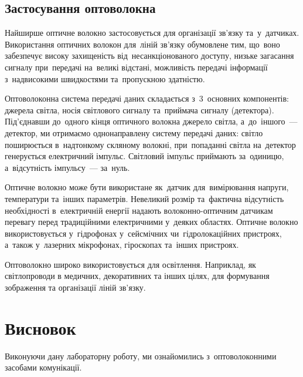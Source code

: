 \documentclass[
	a4paper,
	oneside,
	BCOR = 10mm,
	DIV = 12,
	12pt,
	headings = normal,
]{scrartcl}
\begin{document}
		\subsection{Застосування оптоволокна}
			Найширше оптичне волокно застосовується для організації зв'язку та~у~датчиках. Використання оптичних волокон для~ліній зв'язку обумовлене тим, що~воно забезпечує високу захищеність від~несанкціонованого доступу, низьке загасання сигналу при~передачі на~великі відстані, можливість передачі інформації з~надвисокими швидкостями та~пропускною здатністю.

			Оптоволоконна система передачі даних складається з~3~основних компонентів: джерела світла, носія світлового сигналу та~приймача сигналу (детектора). Під'єднавши до~одного кінця оптичного волокна джерело світла, а~до~іншого~— детектор, ми отримаємо однонаправлену систему передачі даних: світло поширюється в~надтонкому скляному волокні, при~попаданні світла на~детектор генерується електричний імпульс. Світловий імпульс приймають за~одиницю, а~відсутність імпульсу~— за~нуль.

			Оптичне волокно може бути використане як~датчик для~вимірювання напруги, температури та~інших параметрів. Невеликий розмір та~фактична відсутність необхідності в~електричній енергії надають волоконно-оптичним датчикам перевагу перед традиційними електричними у~деяких областях. Оптичне волокно використовується у~гідрофонах у~сейсмічних чи~гідролокаційних пристроях, а~також у~лазерних мікрофонах, гіроскопах та~інших пристроях.

			Оптоволокно широко використовується для освітлення. Наприклад, як світлопроводи в медичних, декоративних та інших цілях, для формування зображення та організації ліній зв'язку.

	\section{Висновок}
		Виконуючи дану лабораторну роботу, ми ознайомились з~оптоволоконними засобами комунікації.
\end{document}

